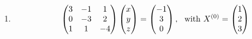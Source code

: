 \documentclass[a4paper,12pt,openany,notitlepage]{book}
\newcounter{num_exercice}
\begin{document}
\begin{enumerate}[label=\alph*)]
	
	\item \begin{align*}
	\begin{pmatrix}
	3 & -1 &  1 \\
	0 & -3 &  2 \\
	1 &  1 & -4
	\end{pmatrix}
	\begin{pmatrix}
	x \\
	y \\
	z
	\end{pmatrix}
	=
	\begin{pmatrix}
	-1 \\
	3 \\
	0
	\end{pmatrix}, \,\,\,\,
	{\rm with} \,\,
	X^{(0)}=
	\begin{pmatrix}
	1 \\
	2 \\
	3
	\end{pmatrix}
	\end{align*}
\end{enumerate}
\end{document}
